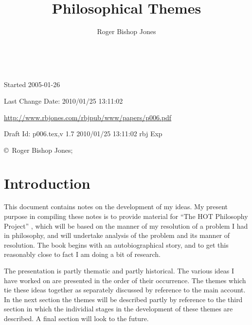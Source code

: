 \documentclass[10pt,titlepage]{book}
\title{Philosophical Themes}
\author{Roger Bishop Jones}
\date{\ }
\begin{document}
\frontmatter

\begin{titlepage}
\maketitle

\vfill


\begin{centering}
\footnotesize{
Started 2005-01-26

Last Change $ $Date: 2010/01/25 13:11:02 $ $

\href{http://www.rbjones.com/rbjpub/www/papers/p006.pdf}{http://www.rbjones.com/rbjpub/www/papers/p006.pdf}

Draft $ $Id: p006.tex,v 1.7 2010/01/25 13:11:02 rbj Exp $ $

\copyright\ Roger Bishop Jones;

}%
\end{centering}

\thispagestyle{empty}
\end{titlepage}

{\parskip=0pt\tableofcontents}


\mainmatter
\chapter{Introduction}

This document contains notes on the development of my ideas.
My present purpose in compiling these notes is to provide material for ``The HOT Philosophy Project'' \cite{rbjb004}, which will be based on the manner of my resolution of a problem I had in philosophy, and will undertake analysis of the problem and its manner of resolution.
The book begins with an autobiographical story, and to get this reasonably close to fact I am doing a bit of research.

The presentation is partly thematic and partly historical.
The various ideas I have worked on are presented in the order of their occurrence.
The themes which tie these ideas together as separately discussed by reference to the main account.
In the next section the themes will be described partly by reference to the third section in which the individial stages in the development of these themes are described.
A final section will look to the future.
\end{document}
